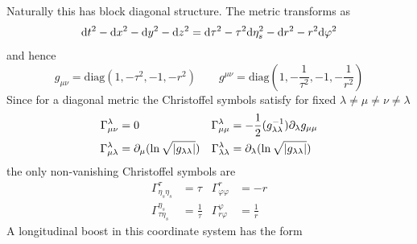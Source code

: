 Naturally this has block diagonal structure. The metric transforms as
\begin{equation}
    \text{d} t^2-\text{d} x^2-\text{d} y^2-\text{d} z^2=\text{d}\tau^2-\tau^2\text{d}\eta_s^2-\text{d} r^2-r^2\text{d}\varphi^2
\end{equation}
and hence
\begin{equation}
    g_{\mu\nu}=\text{diag}(1,-\tau^2,-1,-r^2)\qquad g^{\mu\nu}=\text{diag}(1,-\frac{1}{\tau^2},-1,-\frac{1}{r^2})
\end{equation}
Since for a diagonal metric the Christoffel symbols satisfy for fixed $\lambda\neq\mu\neq\nu\neq\lambda$
\begin{subequations}
    \begin{align}
        \Gamma^\lambda_{\mu\nu}     & =0                                                & \Gamma^\lambda_{\mu\mu}         & =-\frac{1}{2}(g_{\lambda\lambda}^{-1})\partial_\lambda g_{\mu\mu} \\
        \Gamma^\lambda_{\mu\lambda} & =\partial_\mu(\ln\sqrt{{\vert g_{\lambda\lambda}\vert}}) & \Gamma^\lambda_{\lambda\lambda} & =\partial_\lambda(\ln\sqrt{{\vert g_{\lambda\lambda}\vert}})
    \end{align}
\end{subequations}
the only non-vanishing Christoffel symbols are
\begin{subequations}
    \begin{align}
        \Gamma^\tau_{\eta_s\eta_s}   & =\tau           & \Gamma^r_{\varphi\varphi}   & =-r          \\
        \Gamma^{\eta_s}_{\tau\eta_s} & =\frac{1}{\tau} & \Gamma^{\varphi}_{r\varphi} & =\frac{1}{r}
    \end{align}
\end{subequations}
A longitudinal boost in this coordinate system has the form
